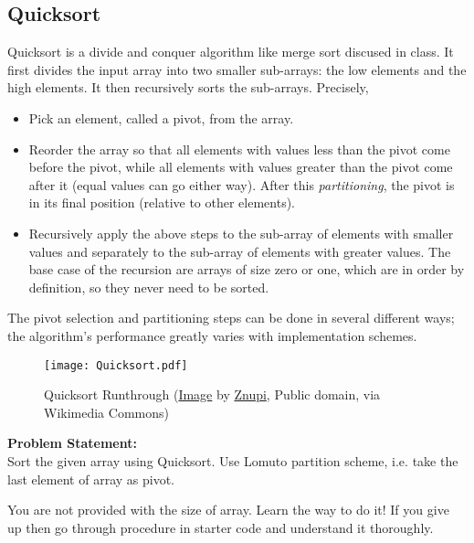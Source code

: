 \subsection{Quicksort}
Quicksort is a divide and conquer algorithm like merge sort discused in class. It first divides the input array into two smaller sub-arrays: the low elements and the high elements. It then
recursively sorts the sub-arrays. Precisely,
\begin{itemize}
	\item Pick an element, called a pivot, from the array.
	\item Reorder the array so that all elements with values less than the pivot come before the pivot, while all elements with values greater than the pivot come after it (equal values can go either way). After this \emph{partitioning}, the pivot is in its final position (relative to other elements).
	\item Recursively apply the above steps to the sub-array of elements with smaller values and separately to the sub-array of elements with greater values. The base case of the recursion are arrays of size zero or one, which are in order by definition, so they never need to be sorted.
\end{itemize}
\begin{note}
	The pivot selection and partitioning steps can be done in several different ways; the algorithm's performance greatly varies with implementation schemes.
\end{note}
\begin{figure}[H]
	\centering
	\texttt{[image: Quicksort.pdf]}
	\caption{Quicksort Runthrough (\href{https://commons.wikimedia.org/wiki/File:Quicksort-diagram.svg}{Image} by \href{https://commons.wikimedia.org/wiki/User:Znupi}{Znupi}, Public domain, via Wikimedia Commons)}
	\label{fig:quicksort}
\end{figure}
\textbf{Problem Statement:}\\
Sort the given array using Quicksort. Use Lomuto partition scheme, i.e. take the last element of array as pivot.
\begin{note}
	You are not provided with the size of array. Learn the way to do it! If you give up then go through procedure in starter code and understand it thoroughly.
\end{note}
